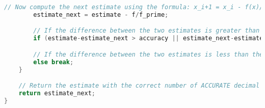 \documentclass[12pt,letterpaper]{article}
\begin{document}
\begin{lstlisting}[language=c, breaklines=true]
		// Now compute the next estimate using the formula: x_i+1 = x_i - f(x)/f'(x)
		estimate_next = estimate - f/f_prime;

		// If the difference between the two estimates is greater than the accuracy, then update the estimate and continue
		if (estimate-estimate_next > accuracy || estimate_next-estimate > accuracy) estimate = estimate_next;

		// If the difference between the two estimates is less than the accuracy, then we have found the square root
		else break;
	}

	// Return the estimate with the correct number of ACCURATE decimal places
	return estimate_next;
}
\end{lstlisting}
\end{document}
